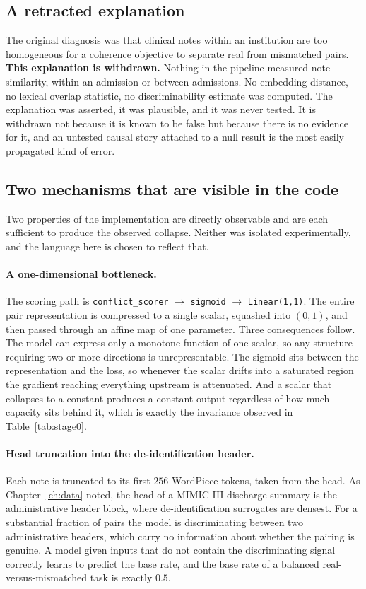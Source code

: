 \subsection{A retracted explanation}

The original diagnosis was that clinical notes within an institution are too
homogeneous for a coherence objective to separate real from mismatched pairs.
\textbf{This explanation is withdrawn.} Nothing in the pipeline measured note
similarity, within an admission or between admissions. No embedding distance, no
lexical overlap statistic, no discriminability estimate was computed. The
explanation was asserted, it was plausible, and it was never tested. It is
withdrawn not because it is known to be false but because there is no evidence
for it, and an untested causal story attached to a null result is the most
easily propagated kind of error.

\subsection{Two mechanisms that are visible in the code}

Two properties of the implementation are directly observable and are each
sufficient to produce the observed collapse. Neither was isolated
experimentally, and the language here is chosen to reflect that.

\paragraph{A one-dimensional bottleneck.} The scoring path is
\texttt{conflict\_scorer} $\rightarrow$ \texttt{sigmoid} $\rightarrow$
\texttt{Linear(1,1)}. The entire pair representation is compressed to a single
scalar, squashed into $(0,1)$, and then passed through an affine map of one
parameter. Three consequences follow. The model can express only a monotone
function of one scalar, so any structure requiring two or more directions is
unrepresentable. The sigmoid sits between the representation and the loss, so
whenever the scalar drifts into a saturated region the gradient reaching
everything upstream is attenuated. And a scalar that collapses to a constant
produces a constant output regardless of how much capacity sits behind it, which
is exactly the invariance observed in Table~\ref{tab:stage0}.

\paragraph{Head truncation into the de-identification header.} Each note is
truncated to its first $256$ WordPiece tokens, taken from the head. As
Chapter~\ref{ch:data} noted, the head of a MIMIC-III discharge summary is the
administrative header block, where de-identification surrogates are densest. For
a substantial fraction of pairs the model is discriminating between two
administrative headers, which carry no information about whether the pairing is
genuine. A model given inputs that do not contain the discriminating signal
correctly learns to predict the base rate, and the base rate of a balanced
real-versus-mismatched task is exactly $0.5$.

